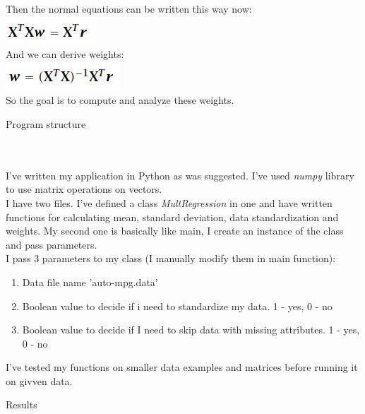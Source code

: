 \documentclass[12pt, letterpaper]{article}
\begin{document}
\begin{enumerate}[label=\Roman*.]
	Then the normal equations can be written this way now: \\
	\includegraphics[scale=0.5]{pics/eq.png} \\
	And we can derive weights: \\
	\includegraphics[scale=0.5]{pics/weights.png} \\
	So the goal is to compute and analyze these weights.
	
	{\bf \item Program structure} \\\\
	I've written my application in Python as was suggested. I've used {\it numpy} library to use matrix operations on vectors. \\
	I have two files.  I've defined a class {\it MultRegression} in one and have written functions for calculating mean, standard deviation, data standardization and weights. My second one is basically like main, I create an instance of the class and pass parameters.\\
	I pass 3 parameters to my class (I manually modify them in main function): 
	\begin{enumerate}[label=\arabic*.]
		\item Data file name 'auto-mpg.data'
		\item Boolean value to decide if i need to standardize my data. 1 - yes, 0 - no
		\item Boolean value to decide if I need to skip data with missing attributes. 1 - yes, 0 - no
	\end{enumerate}
	I've tested my functions on smaller data examples and matrices before running it on givven data.
	
	{\bf \item Results} \\
	

\end{enumerate}
\end{document}
